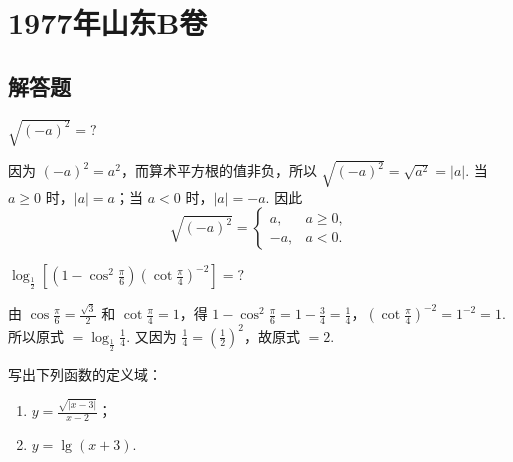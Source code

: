 
\chapter{1977年山东B卷}

\section{解答题}

\begin{problem}
\(\sqrt{\left( -a \right)^2}=?\)
\end{problem}

\begin{solution}
因为 \(\left( -a \right)^2=a^2\)，而算术平方根的值非负，所以
\(\sqrt{\left( -a \right)^2}=\sqrt{a^2}=\lvert a\rvert\). 当 \(a\geqslant0\) 时，\(\lvert a\rvert=a\)；当 \(a<0\) 时，\(\lvert a\rvert=-a\). 因此
\[
\sqrt{\left( -a \right)^2}=\begin{cases}
a, & a\geqslant0,\\
-a, & a<0.
\end{cases}
\]
\end{solution}

\begin{problem}
\(\log_{\frac{1}{2}}\left[ \left( 1-\cos^2\frac{\pi}{6} \right)\left( \cot\frac{\pi}{4} \right)^{-2} \right]=?\)
\end{problem}

\begin{solution}
由 \(\cos\frac{\pi}{6}=\frac{\sqrt{3}}{2}\) 和 \(\cot\frac{\pi}{4}=1\)，得
\(1-\cos^2\frac{\pi}{6}=1-\frac{3}{4}=\frac{1}{4}\)，\(\left( \cot\frac{\pi}{4} \right)^{-2}=1^{-2}=1\).
所以原式 \(=\log_{\frac{1}{2}}\frac{1}{4}\). 又因为 \(\frac{1}{4}=\left(\frac{1}{2}\right)^2\)，故原式 \(=2\).
\end{solution}

\begin{problem}
写出下列函数的定义域：

\begin{enumerate}
\item \(y=\frac{\sqrt{\lvert x-3\rvert}}{x-2}\)；
\item \(y=\lg\left( x+3 \right)\).
\end{enumerate}
\end{problem}

